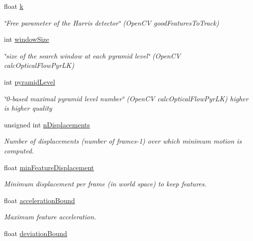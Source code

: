 \begin{DoxyCompactItemize}
float \hyperlink{structKLTFeatureTrackingParameters_a6a959cf31cc7e44c36f6cd50b29ef11b}{k}
\begin{DoxyCompactList}\small\item\em \char`\"{}\-Free parameter of the Harris detector\char`\"{} (Open\-C\-V good\-Features\-To\-Track) \end{DoxyCompactList}\item 
int \hyperlink{structKLTFeatureTrackingParameters_a95b45dfb47f9f26633b252d3f4a68df3}{window\-Size}
\begin{DoxyCompactList}\small\item\em \char`\"{}size of the search window at each pyramid level\char`\"{} (Open\-C\-V calc\-Optical\-Flow\-Pyr\-L\-K) \end{DoxyCompactList}\item 
int \hyperlink{structKLTFeatureTrackingParameters_aeba87313d1ee04d20c8edbbc974a80ac}{pyramid\-Level}
\begin{DoxyCompactList}\small\item\em \char`\"{}0-\/based maximal pyramid level number\char`\"{} (Open\-C\-V calc\-Optical\-Flow\-Pyr\-L\-K) higher is higher quality \end{DoxyCompactList}\item 
unsigned int \hyperlink{structKLTFeatureTrackingParameters_a1b5dba549536ac01c2817a63c138b9a7}{n\-Displacements}
\begin{DoxyCompactList}\small\item\em Number of displacements (number of frames-\/1) over which minimum motion is computed. \end{DoxyCompactList}\item 
float \hyperlink{structKLTFeatureTrackingParameters_a77753bc52f8cf4dd6f9e7f0061f24fe9}{min\-Feature\-Displacement}
\begin{DoxyCompactList}\small\item\em Minimum displacement per frame (in world space) to keep features. \end{DoxyCompactList}\item 
float \hyperlink{structKLTFeatureTrackingParameters_a3d39ac0306730636b9f3ac94ea7448d1}{acceleration\-Bound}
\begin{DoxyCompactList}\small\item\em Maximum feature acceleration. \end{DoxyCompactList}\item 
float \hyperlink{structKLTFeatureTrackingParameters_a692406d82ec8adad42321e13a7c6e9af}{deviation\-Bound}

\end{DoxyCompactItemize}

